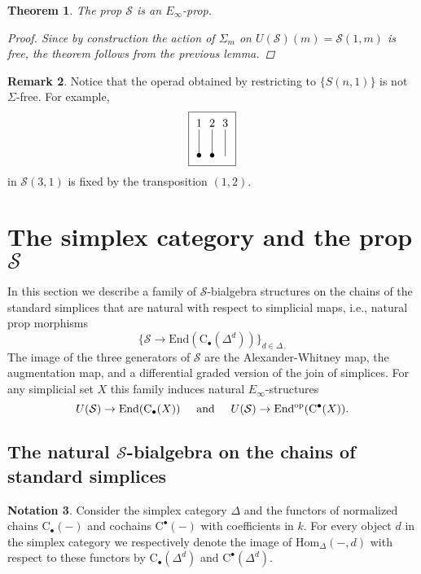 \documentclass{amsart}
\renewcommand{\S}{\mathcal{S}}
\newcommand{\chains}{\mathrm{C}_\bullet}
\newcommand{\cochains}{\mathrm{C}^\bullet}
\newcommand{\Hom}{\mathrm{Hom}}
\newcommand{\End}{\mathrm{End}}
\newtheorem{theorem}{Theorem}
\theoremstyle{definition}
\newtheorem{remark}[theorem]{Remark}
\newtheorem{notation}[theorem]{Notation}
\begin{document}
	\begin{theorem} \label{sigma-free resolution}
		The prop $\S$ is an $E_\infty$-prop.
		\begin{proof}
			Since by construction the action of $\Sigma_m$ on $U(\S)(m)=\S(1,m)$ is free, the theorem follows from the previous lemma.
		\end{proof}
	\end{theorem}
	
	\begin{remark}
		Notice that the operad obtained by restricting to $\{S(n,1)\}$ is not $\Sigma$-free. For example, 
		\begin{equation*}
			\boxed{\begin{tikzpicture}[scale=.4]
				\node at (0,0){$\bullet$}; \draw (0,0) -- (0,2); \node at (0,2.5){$1$};
				\node at (1,0){$\bullet$}; \draw (1,0) -- (1,2); \node at (1,2.5){$2$};
				\draw (2,-.05) -- (2,2); \node at (2,2.5){$3$};
				\end{tikzpicture}}
		\end{equation*}
		in $\S(3,1)$ is fixed by the transposition $(1,2)$.
	\end{remark}	
	
	\section{The simplex category and the prop $\S$}
	In this section we describe a family of $\S$-bialgebra structures on the chains of the standard simplices that are natural with respect to simplicial maps, i.e., natural prop morphisms 
	$$\big\{\S\to\End(\chains(\Delta^d))\big\}_{d\in\Delta\, .}$$
	The image of the three generators of $\S$ are the Alexander-Whitney map, the augmentation map, and a differential graded version of the join of simplices. For any simplicial set $X$ this family induces natural $E_\infty$-structures
	$$U(\S)\to \End(\chains(X))\hspace*{.5cm}\text{and}\hspace*{.5cm}U(\S)\to \End^{\mathrm{op}}(\cochains(X)).$$
	
	\subsection{The natural $\S$-bialgebra on the chains of standard simplices}
	\begin{notation}
		Consider the simplex category $\Delta$ and the functors of normalized chains $\chains(-)$ and cochains $\cochains(-)$ with coefficients in $k$. For every object $d$ in the simplex category we respectively denote the image of $\Hom_{\Delta}(-,d)$ with respect to these functors by $\chains(\Delta^d)$ and $\cochains(\Delta^d)$.
	\end{notation}
	
\end{document}
